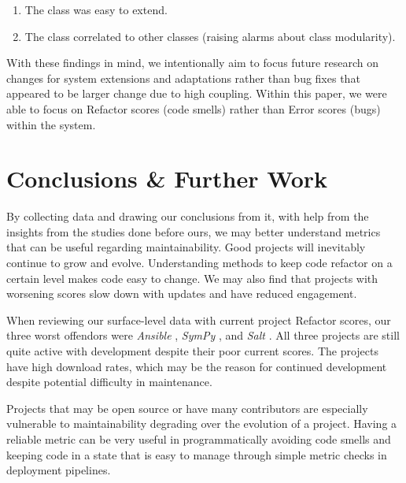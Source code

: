 \documentclass[12pt,conference]{IEEEtran}
\begin{document}
\begin{enumerate}
    \item The class was easy to extend.
    \item The class correlated to other classes (raising alarms about class modularity).
\end{enumerate}

\vspace{0.25cm}

With these findings in mind, we intentionally aim to focus future research on changes for system extensions and adaptations rather than bug fixes that appeared to be larger change due to high coupling. Within this paper, we were able to focus on Refactor scores (code smells) rather than Error scores (bugs) within the system.


\vspace{0.5cm}
\section{Conclusions \& Further Work}
\vspace{0.25cm}

By collecting data and drawing our conclusions from it, with help from the insights from the studies done before ours, we may better understand metrics that can be useful regarding maintainability. Good projects will inevitably continue to grow and evolve. Understanding methods to keep code refactor on a certain level makes code easy to change. We may also find that projects with worsening scores slow down with updates and have reduced engagement.

When reviewing our surface-level data with current project Refactor scores, our three worst offendors were \emph{Ansible} \cite{data:ansible}, \emph{SymPy} \cite{data:sympy}, and \emph{Salt} \cite{data:salt}. All three projects are still quite active with development despite their poor current scores. The projects have high download rates, which may be the reason for continued development despite potential difficulty in maintenance. 

Projects that may be open source or have many contributors are especially vulnerable to maintainability degrading over the evolution of a project. Having a reliable metric can be very useful in programmatically avoiding code smells and keeping code in a state that is easy to manage through simple metric checks in deployment pipelines.
\end{document}

